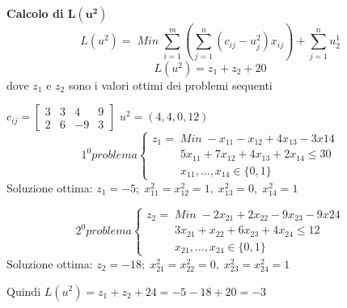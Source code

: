 \textbf{Calcolo di $\boldsymbol{L(u^{2})}$}
\begin{equation}
L(u^{2})=\;Min\;\sum_{i=1}^{m}(\sum_{j=1}^{n}(c_{ij}-u_{j}^{2})x_{ij})+\sum_{j=1}^{n}u_{2}^{1}
\end{equation}
\begin{equation}
	L(u^{2})=z_{1}+z_{2}+20
\end{equation}
dove $z_{1}$ e $z_{2}$ sono i valori ottimi dei problemi sequenti

$c_{ij}=\begin{bmatrix}3 & 3 & 4 & 9 \\ 2 & 6 & -9 & 3\end{bmatrix}$\newline
$u^{2}=(4,4,0,12)$
\begin{displaymath}
1^{0} problema
\begin{cases}
z_{1}=\;Min\;-x_{11}-x_{12}+4x_{13}-3x{14}\\
\;\;\;\;\;\;\;\;\;5x_{11}+7x_{12}+4x_{13}+2x_{14}\le 30\\
\;\;\;\;\;\;\;\;\;x_{11},\dots,x_{14}\in\{0,1\}
\end{cases}
\end{displaymath}
Soluzione ottima: $z_{1}=-5;\;x_{11}^{2}=x_{12}^{2}=1,\;x_{13}^{2}=0,\;x_{14}^{2}=1$

\begin{displaymath}
2^{0} problema
\begin{cases}
z_{2}=\;Min\;-2x_{21}+2x_{22}-9x_{23}-9x{24}\\
\;\;\;\;\;\;\;\;\;3x_{21}+x_{22}+6x_{23}+4x_{24}\le 12\\
\;\;\;\;\;\;\;\;\;x_{21},\dots,x_{24}\in\{0,1\}
\end{cases}
\end{displaymath}
Soluzione ottima: $z_{2}=-18;\;x_{21}^{2}=x_{22}^{2}=0,\;x_{23}^{2}=x_{24}^{2}=1$

Quindi $L(u^{2})=z_{1}+z_{2}+24=-5-18+20=-3$

